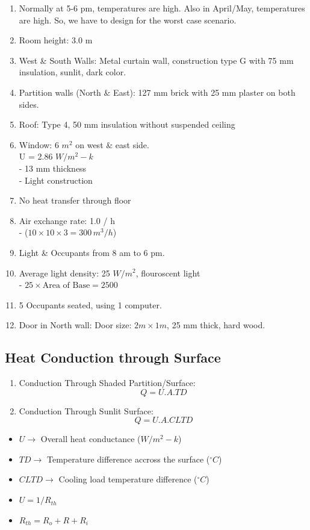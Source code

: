 \documentclass{article}
\begin{document}
\begin{multicols}{2}
  \begin{enumerate}
    \item Normally at 5-6 pm, temperatures are high. Also in April/May, temperatures are high. So, we have to design for the worst case scenario.
    \item Room height: 3.0 m
    \item West \& South Walls: Metal curtain wall, construction type G with 75 mm insulation, sunlit, dark color. 
    \item Partition walls (North \& East): 127 mm brick with 25 mm plaster on both sides. 
    \item Roof: Type 4, 50 mm insulation without suspended ceiling 
    \item Window: 6 $m^2$ on west \& east side.\\U = 2.86 $W/m^2-k$\\- 13 mm thickness\\- Light construction  
    \item No heat transfer through floor
    \item Air exchange rate: 1.0 / h \\- ($10 \times 10 \times 3 = 300 \, m^3/h$)
    \item Light \& Occupants from 8 am to 6 pm. 
    \item Average light density: 25 $W/m^2$, flouroscent light\\- $25 \times \text{Area of Base} = 2500$
    \item 5 Occupants seated, using 1 computer. 
    \item Door in North wall: Door size: $2 m \times 1 m$, 25 mm thick, hard wood. 
  \end{enumerate}

  \subsection*{Heat Conduction through Surface}
  \begin{enumerate}
    \item Conduction Through Shaded Partition/Surface:\\
    $$Q = U.A.TD$$ 
    \item Conduction Through Sunlit Surface:\\
    $$Q = U.A.CLTD$$
  \end{enumerate}
  \begin{itemize}
    \item $U \rightarrow$ Overall heat conductance ($W/m^2-k$)
    \item $TD \rightarrow$ Temperature difference accross the surface ($^\circ C$)
    \item $CLTD \rightarrow$  Cooling load temperature difference ($^\circ C$)
    \item $U = 1/R_{th}$ 
    \item $R_{th} = R_{o} + R + R_{i}$
  \end{itemize}
\end{multicols}
\end{document}
